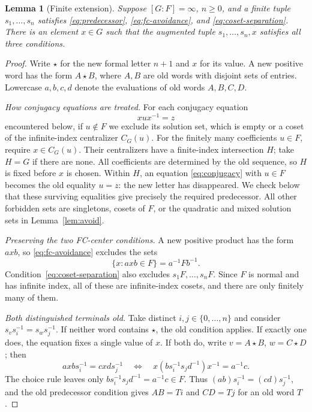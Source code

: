 \documentclass[11pt,letterpaper]{amsart}
\newtheorem{lemma}[theorem]{Lemma}
\theoremstyle{definition}
\theoremstyle{remark}
\begin{document}
\begin{lemma}[Finite extension]\label{lem:extension}
Suppose $[G:F]=\infty$, $n\geq0$, and a finite tuple
$s_1,\ldots,s_n$ satisfies \eqref{eq:predecessor},
\eqref{eq:fc-avoidance}, and \eqref{eq:coset-separation}.
There is an element $x\in G$ such that the augmented tuple
$s_1,\ldots,s_n,x$ satisfies all three conditions.
\end{lemma}
\begin{proof}
Write $\star$ for the new formal letter $n+1$ and $x$ for its value.
A new positive word has the form $A\star B$, where $A,B$ are old
words with disjoint sets of entries. Lowercase $a,b,c,d$ denote the
evaluations of old words $A,B,C,D$.

\smallskip\noindent
\emph{How conjugacy equations are treated.}
For each conjugacy equation
\begin{equation}\label{eq:conjugacy}
 xux^{-1}=z
\end{equation}
encountered below, if $u\notin F$ we exclude its solution set, which
is empty or a coset of the infinite-index centralizer $C_G(u)$.
For the finitely many coefficients $u\in F$, require $x\in C_G(u)$.
Their centralizers have a finite-index intersection $H$; take $H=G$
if there are none. All coefficients are determined by the old
sequence, so $H$ is fixed before $x$ is chosen. Within $H$, an equation
\eqref{eq:conjugacy} with $u\in F$ becomes the old equality $u=z$:
the new letter has disappeared. We check below that these surviving
equalities give precisely the required predecessor.
All other forbidden sets are singletons, cosets of $F$, or the
quadratic and mixed solution sets in Lemma~\ref{lem:avoid}.

\smallskip\noindent
\emph{Preserving the two FC-center conditions.}
A new positive product has the form $axb$, so
\eqref{eq:fc-avoidance} excludes the sets
\[
 \{x:axb\in F\}=a^{-1}Fb^{-1}.
\]
Condition~\eqref{eq:coset-separation} also excludes $s_1F,\ldots,s_nF$.
Since $F$ is normal and has infinite index, all of these are
infinite-index cosets, and there are only finitely many of them.

\smallskip\noindent
\emph{Both distinguished terminals old.}
Take distinct $i,j\in\{0,\ldots,n\}$ and consider
$s_vs_i^{-1}=s_ws_j^{-1}$. If neither word contains $\star$, the old
condition applies. If exactly one does, the equation fixes a single
value of $x$. If both do, write $v=A\star B$, $w=C\star D$; then
\[
 axb s_i^{-1}=cxd s_j^{-1}
 \quad\Longleftrightarrow\quad
 x(bs_i^{-1}s_jd^{-1})x^{-1}=a^{-1}c.
\]
The choice rule leaves only
$bs_i^{-1}s_jd^{-1}=a^{-1}c\in F$. Thus
$(ab)s_i^{-1}=(cd)s_j^{-1}$, and the old predecessor condition gives
$AB=Ti$ and $CD=Tj$ for an old word $T$.


\end{proof}
\end{document}
